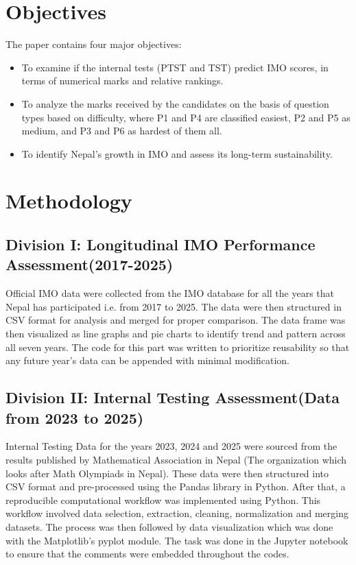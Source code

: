 \documentclass{report}
\begin{document}
\section{Objectives}
The paper contains four major objectives: 

\begin{itemize}
    \item[I)] To examine if the internal tests (PTST and TST) predict IMO scores, in terms of numerical marks and relative rankings.
    \item[II)] To analyze the marks received by the candidates on the basis of question types based on difficulty, where P1 and P4 are classified easiest, P2 and P5 as medium, and P3 and P6 as hardest of them all.
    \item[III)] To identify Nepal's growth in IMO and assess its long-term sustainability.
\end{itemize}
\newpage
\section{Methodology}

\subsection{Division I: Longitudinal IMO Performance Assessment(2017-2025)}
Official IMO data were collected from the IMO database for all the years that Nepal has participated i.e. from 2017 to 2025. The data were then structured in CSV format for analysis and merged for proper comparison. The data frame was then visualized as line graphs and pie charts to identify trend and pattern across all seven years. The code for this part was written to prioritize reusability so that any future year's data can be appended with minimal modification.

\subsection{Division II: Internal Testing Assessment(Data from 2023 to 2025)}
Internal Testing Data for the years 2023, 2024 and 2025 were sourced from the results published by Mathematical Association in Nepal (The organization which looks after Math Olympiads in Nepal). These data were then structured into CSV format and pre-processed using the Pandas library in Python. After that, a reproducible computational workflow was implemented using Python. This workflow involved data selection, extraction, cleaning, normalization and merging datasets. The process was then followed by data visualization which was done with the Matplotlib's pyplot module. The task was done in the Jupyter notebook to ensure that the comments were embedded throughout the codes. 
\end{document}
